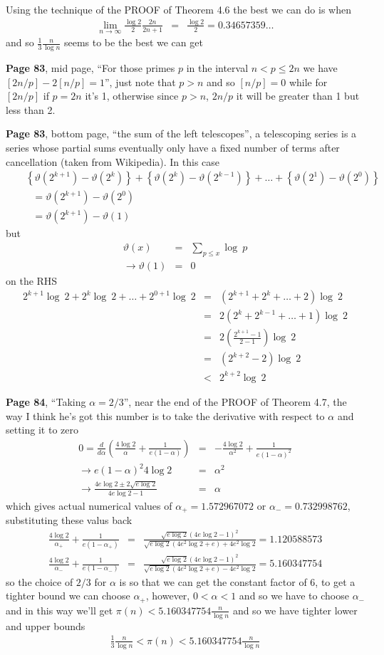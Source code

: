 \documentclass[aps,preprint,preprintnumbers,nofootinbib,showpacs,prd]{revtex4-1}
\newcommand{\nbea}{\begin{eqnarray*}}
\newcommand{\neea}{\end{eqnarray*}}
\begin{document}
Using the technique of the PROOF of Theorem 4.6 the best we can do is when
%
\nbea
\lim_{n\to\infty}\frac{\log2}{2}\frac{2n}{2n+1} & = & \frac{\log 2}{2} = 0.34657359\ldots
\neea
%
and so $\frac{1}{3}\frac{n}{\log n}$ seems to be the best we can get

{\bf Page 83}, mid page, ``For those primes $p$ in the interval $n < p \le 2n$ we have $\left\lbrack 2n/p\right\rbrack - 2\left\lbrack n/p\right\rbrack = 1$'', just note that $p > n$ and so $\left\lbrack n/p\right\rbrack=0$ while for $\left\lbrack 2n/p\right\rbrack$ if $p=2n$ it's 1, otherwise since $p > n$, $2n/p$ it will be greater than 1 but less than 2.

{\bf Page 83}, bottom page, ``the sum of the left telescopes'', a telescoping series is a series whose partial sums eventually only have a fixed number of terms after cancellation (taken from Wikipedia). In this case
%
\nbea
&& \left\{\vartheta(2^{k+1}) - \vartheta(2^k)\right\} + \left\{\vartheta(2^{k}) - \vartheta(2^{k-1})\right\} + \ldots + \left\{\vartheta(2^{1}) - \vartheta(2^0)\right\} \\
&& ~~~ = \vartheta(2^{k+1}) - \vartheta(2^0) \\
&& ~~~ = \vartheta(2^{k+1}) - \vartheta(1)
\neea
%
but
%
\nbea
\vartheta(x) & = & \sum_{p\le x} \log~p \\
\to \vartheta(1) & = & 0
\neea
%
on the RHS
%
\nbea
2^{k+1}\log~2 + 2^{k}\log~2 + \ldots + 2^{0+1}\log~2 & = & \left ( 2^{k+1} + 2^k + \ldots + 2\right )\log~2 \\
& = & 2\left ( 2^{k} + 2^{k-1} + \ldots + 1\right )\log~2 \\
& = & 2 \left ( \frac{2^{k+1}-1}{2-1}\right ) \log~2 \\
& = & (2^{k+2}-2) \log~2 \\
& < & 2^{k+2}\log~2
\neea
%

{\bf Page 84}, ``Taking $\alpha=2/3$'', near the end of the PROOF of Theorem 4.7, the way I think he's got this number is to take the derivative with respect to $\alpha$ and setting it to zero
%
\nbea
0 = \frac{d}{d\alpha}\left ( \frac{4\log 2}{\alpha} + \frac{1}{e(1-\alpha)}\right ) & = & -\frac{4\log 2}{\alpha^2} + \frac{1}{e(1-\alpha)^2} \\
\to e(1-\alpha)^2 4\log 2 & = & \alpha^2 \\
\to \frac{4e\log2 \pm 2\sqrt{e\log2}}{4e\log2-1} & = & \alpha
\neea
%
which gives actual numerical values of $\alpha_+=1.572967072$ or $\alpha_-=0.732998762$, substituting these valus back
%
\nbea
\frac{4\log 2}{\alpha_+} + \frac{1}{e(1-\alpha_+)} & = & \frac{\sqrt{e\log2}(4e\log2-1)^2}{\sqrt{e\log2}(4e^2\log2 + e) + 4e^2\log2} = 1.120588573\\
\frac{4\log 2}{\alpha_-} + \frac{1}{e(1-\alpha_-)} & = & \frac{\sqrt{e\log2}(4e\log2-1)^2}{\sqrt{e\log2}(4e^2\log2 + e) - 4e^2\log2} = 5.160347754
\neea
%
so the choice of $2/3$ for $\alpha$ is so that we can get the constant factor of $6$, to get a tighter bound we can choose $\alpha_+$, however, $0 <\alpha < 1$ and so we have to choose $\alpha_-$ and in this way we'll get $\pi(n) < 5.160347754 \frac{n}{\log n}$ and so we have tighter lower and upper bounds
%
\nbea
\frac{1}{3}\frac{n}{\log n} < \pi(n) < 5.160347754 \frac{n}{\log n}
\neea
%
\end{document}
